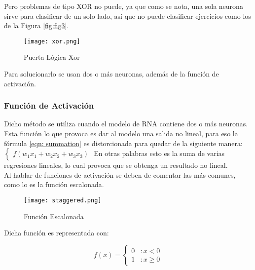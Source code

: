         Pero problemas de tipo XOR no puede, ya que como se nota, una sola neurona sirve para 
        clasificar de un solo lado, así que no puede clasificar ejercicios
        como los de la Figura \eqref{fig:fig3}.

        \begin{figure}[H]
            \centering
            \texttt{[image: xor.png]}
            \caption{Puerta L\'ogica Xor \cite{mcmahon2014}}
            \label{fig:fig3}
        \end{figure}

        Para solucionarlo se usan dos o m\'as neuronas, adem\'as de la funci\'on de activaci\'on.

            \subsubsection{Funci\'on de Activaci\'on} \label{sec: activation}
            
            
                Dicho m\'etodo se utiliza cuando el modelo de RNA contiene dos o m\'as neuronas.
                Esta funci\'on lo que provoca es dar al modelo una salida no lineal, para 
                eso la f\'ormula \eqref{eqn: summation} es distorcionada para quedar de la siguiente 
                manera: 
                $\begin{cases}
                    f( w_1x_1 + w_2x_2 + w_3x_3 )
                \end{cases}$
                En otras palabras esto es la suma de varias regresiones lineales, lo cual provoca que se obtenga 
                un resultado no lineal. \\
                
                Al hablar de funciones de activaci\'on se deben de comentar las m\'as comunes, como lo es la 
                funci\'on escalonada.
                
                \begin{figure}[H]
                    \centering
                    \texttt{[image: staggered.png]}
                    \caption{Funci\'on Escalonada}
                    \label{fig:fig4}
                \end{figure}

                Dicha funci\'on es representada con: 
                
                \[f(x) = \left\{ \begin{array}{lr} 0 & : x < 0\\ 1 & : x \ge 0 \end{array} \right. \]

